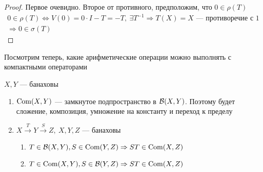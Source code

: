 \documentclass[document]{subfiles}
\begin{document}
\begin{proof}
    Первое очевидно. Второе от противного, предположим, что $0 \in \rho(T)$
    \begin{gather*}
        0 \in \rho(T) \Leftrightarrow V(0) = 0 \cdot I - T = -T, \: \exists T^{-1} \Rightarrow T(X) = X \text{ --- противоречие с 1} \\
        \Rightarrow 0 \in \sigma(T)
    \end{gather*}
\end{proof}

Посмотрим теперь, какие арифметические операции можно выполнять с компактными операторами

\begin{theorem}
    $X,Y$ --- банаховы 
    \begin{enumerate}
        \item $\operatorname{Com}(X,Y)$ --- замкнутое подпространство в $\mathcal{B}(X,Y)$. Поэтому будет сложение, композиция, умножение на константу и переход к пределу 
        \item $X \stackrel{T}{\rightarrow} Y \stackrel{S}{\rightarrow} Z, \: X, Y, Z$ --- банаховы
            \begin{enumerate}
                \item $T \in \mathcal{B}(X,Y), S \in \operatorname{Com}(Y,Z) \Rightarrow ST \in \operatorname{Com}(X,Z)$
                \item $T \in \operatorname{Com}(X,Y), S \in \mathcal{B}(Y,Z) \Rightarrow ST \in \operatorname{Com}(X,Z)$
            \end{enumerate}
    \end{enumerate}
\end{theorem}
\end{document}
